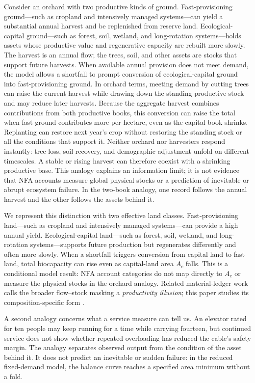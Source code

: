 \documentclass[preprint,12pt,authoryear]{elsarticle}
\begin{document}
Consider an orchard with two productive kinds of ground. Fast-provisioning ground—such as cropland and intensively managed systems—can yield a substantial annual harvest and be replenished from reserve land. Ecological-capital ground—such as forest, soil, wetland, and long-rotation systems—holds assets whose productive value and regenerative capacity are rebuilt more slowly. The harvest is an annual flow; the trees, soil, and other assets are stocks that support future harvests. When available annual provision does not meet demand, the model allows a shortfall to prompt conversion of ecological-capital ground into fast-provisioning ground. In orchard terms, meeting demand by cutting trees can raise the current harvest while drawing down the standing productive stock and may reduce later harvests. Because the aggregate harvest combines contributions from both productive books, this conversion can raise the total when fast ground contributes more per hectare, even as the capital book shrinks. Replanting can restore next year's crop without restoring the standing stock or all the conditions that support it. Neither orchard nor harvesters respond instantly: tree loss, soil recovery, and demographic adjustment unfold on different timescales. A stable or rising harvest can therefore coexist with a shrinking productive base. This analogy explains an information limit; it is not evidence that NFA accounts measure global physical stocks or a prediction of inevitable or abrupt ecosystem failure. In the two-book analogy, one record follows the annual harvest and the other follows the assets behind it.

We represent this distinction with two effective land classes. Fast-provisioning land—such as cropland and intensively managed systems—can provide a high annual yield. Ecological-capital land—such as forest, soil, wetland, and long-rotation systems—supports future production but regenerates differently and often more slowly. When a shortfall triggers conversion from capital land to fast land, total biocapacity can rise even as capital-land area $A_c$ falls. This is a conditional model result: NFA account categories do not map directly to $A_c$ or measure the physical stocks in the orchard analogy. Related material-ledger work calls the broader flow--stock masking a \emph{productivity illusion}; this paper studies its composition-specific form \citep{Abaee2026c}.

A second analogy concerns what a service measure can tell us. An elevator rated for ten people may keep running for a time while carrying fourteen, but continued service does not show whether repeated overloading has reduced the cable's safety margin. The analogy separates observed output from the condition of the asset behind it. It does not predict an inevitable or sudden failure: in the reduced fixed-demand model, the balance curve reaches a specified area minimum without a fold.
\end{document}

